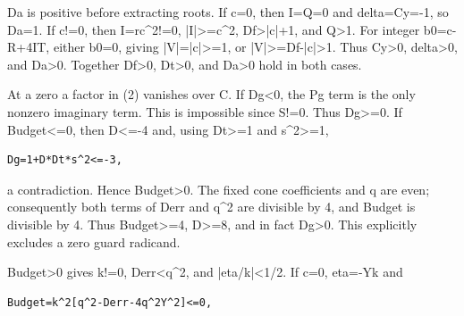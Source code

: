 Da is positive before extracting roots. If c=\allowbreak{}0, then I=\allowbreak{}Q=\allowbreak{}0 and delta=\allowbreak{}Cy=\allowbreak{}-1, so Da=\allowbreak{}1. If c!=\allowbreak{}0, then I=\allowbreak{}rc\textasciicircum{}\allowbreak{}2!=\allowbreak{}0, |I|\textgreater{}\allowbreak{}=\allowbreak{}c\textasciicircum{}\allowbreak{}2, Df\textgreater{}\allowbreak{}|c|+\allowbreak{}1, and Q\textgreater{}\allowbreak{}1. For integer b0=\allowbreak{}c-R+\allowbreak{}4IT, either b0=\allowbreak{}0, giving |V|=\allowbreak{}|c|\textgreater{}\allowbreak{}=\allowbreak{}1, or |V|\textgreater{}\allowbreak{}=\allowbreak{}Df-|c|\textgreater{}\allowbreak{}1. Thus Cy\textgreater{}\allowbreak{}0, delta\textgreater{}\allowbreak{}0, and Da\textgreater{}\allowbreak{}0. Together Df\textgreater{}\allowbreak{}0, Dt\textgreater{}\allowbreak{}0, and Da\textgreater{}\allowbreak{}0 hold in both cases.



At a zero a factor in (2) vanishes over C. If Dg\textless{}\allowbreak{}0, the Pg term is the only nonzero imaginary term. This is impossible since S!=\allowbreak{}0. Thus Dg\textgreater{}\allowbreak{}=\allowbreak{}0. If Budget\textless{}\allowbreak{}=\allowbreak{}0, then D\textless{}\allowbreak{}=\allowbreak{}-4 and, using Dt\textgreater{}\allowbreak{}=\allowbreak{}1 and s\textasciicircum{}\allowbreak{}2\textgreater{}\allowbreak{}=\allowbreak{}1,



\begin{verbatim}
Dg=1+D*Dt*s^2<=-3,
\end{verbatim}

a contradiction. Hence Budget\textgreater{}\allowbreak{}0. The fixed cone coefficients and q are even; consequently both terms of Derr and q\textasciicircum{}\allowbreak{}2 are divisible by 4, and Budget is divisible by 4. Thus Budget\textgreater{}\allowbreak{}=\allowbreak{}4, D\textgreater{}\allowbreak{}=\allowbreak{}8, and in fact Dg\textgreater{}\allowbreak{}0. This explicitly excludes a zero guard radicand.



Budget\textgreater{}\allowbreak{}0 gives k!=\allowbreak{}0, Derr\textless{}\allowbreak{}q\textasciicircum{}\allowbreak{}2, and |eta/\allowbreak{}k|\textless{}\allowbreak{}1/\allowbreak{}2. If c=\allowbreak{}0, eta=\allowbreak{}-Yk and



\begin{verbatim}
Budget=k^2[q^2-Derr-4q^2Y^2]<=0,
\end{verbatim}

